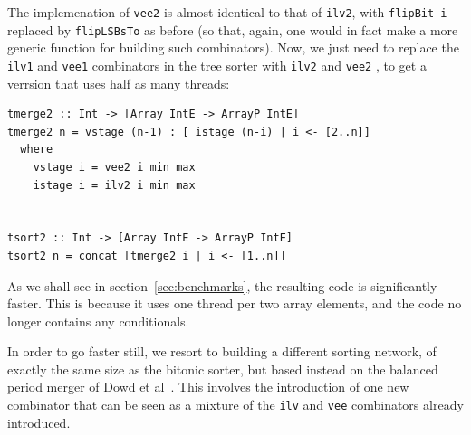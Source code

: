 The implemenation of {\tt vee2} is almost identical to
that of {\tt ilv2}, with {\tt flipBit i}
replaced by {\tt flipLSBsTo} as before (so that, again, one would in
fact make a more generic function for building such combinators).
Now, we just need to replace the {\tt ilv1} and {\tt vee1} combinators
in the tree sorter with {\tt ilv2} and {\tt vee2} , to get a verrsion that uses half as many threads:
\begin{codesize}
\begin{verbatim}
tmerge2 :: Int -> [Array IntE -> ArrayP IntE]
tmerge2 n = vstage (n-1) : [ istage (n-i) | i <- [2..n]]
  where
    vstage i = vee2 i min max
    istage i = ilv2 i min max


tsort2 :: Int -> [Array IntE -> ArrayP IntE]
tsort2 n = concat [tmerge2 i | i <- [1..n]]
\end{verbatim}
\end{codesize}
As we shall see in section~\ref{sec:benchmarks}, the resulting code
is significantly faster. This is because it uses one thread per two array elements,
and the code no longer contains any conditionals.

In order to go faster still, we resort to building a different sorting network, of
exactly the same size as the bitonic sorter, but based instead on the balanced period merger of Dowd et al~\cite{PeriodicBalanced}.
This involves the introduction of one new combinator that can be seen as a mixture
of the {\tt ilv} and {\tt vee} combinators already introduced.


